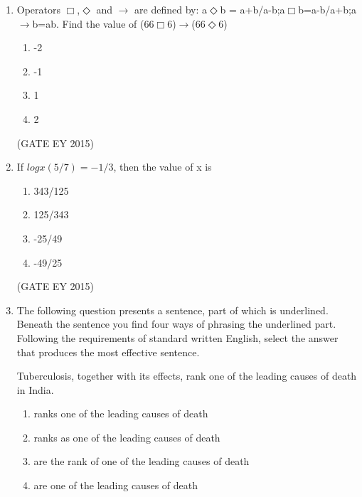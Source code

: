 \documentclass[journal,12pt,onecolumn]{IEEEtran}
\theoremstyle{remark}
\begin{document}
\begin{enumerate}
\begin{multicols}{4}
\begin{enumerate}
    \end{enumerate}
    \end{multicols}
\hfill{(GATE EY 2015)}
\item 

Operators $\Box$,$\Diamond$ and $\rightarrow$ are defined by: a$\Diamond$b = a+b/a-b;a$\Box$b=a-b/a+b;a$\rightarrow$b=ab.
Find the value of (66$\Box$6)$\rightarrow$(66$\Diamond$6)

\begin{multicols}{4}
\begin{enumerate}
    
\item -2
\item -1
\item  1
\item 2

    \end{enumerate}
    \end{multicols}
\hfill{(GATE EY 2015)}


\item 
If $logx (5/7) = -1/3$, then the value of x is

\begin{multicols}{4}
\begin{enumerate}
    
\item 343/125
\item 125/343
\item -25/49
\item -49/25

    \end{enumerate}
    \end{multicols}
\hfill{(GATE EY 2015)}

\item 
The following question presents a sentence, part of which is underlined.
Beneath the sentence you find four ways of phrasing the underlined part.
Following the requirements of standard written English, select the answer that produces the most effective sentence.

Tuberculosis, together with its effects, rank one of the leading causes of death in India.


\begin{enumerate}
    
\item ranks one of the leading causes of death
\item ranks as one of the leading causes of death
\item are the rank of one of the leading causes of death
\item are one of the leading causes of death


\end{enumerate}
\end{enumerate}
\end{document}
